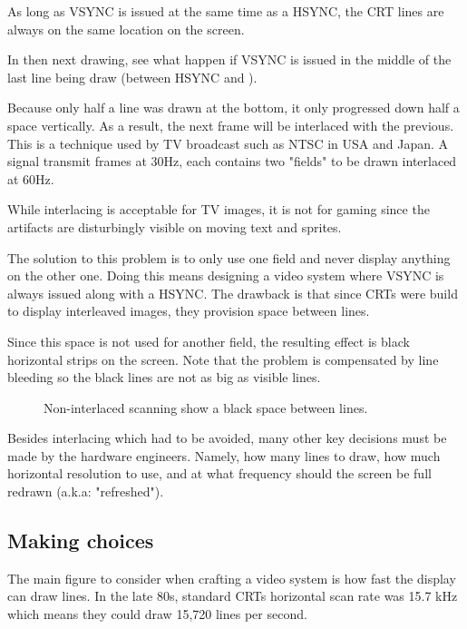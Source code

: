 
As long as VSYNC is issued at the same time as a HSYNC, the CRT lines are always on the same location on the screen.

In then next drawing, see what happen if VSYNC  is issued in the middle of the last line being draw (between HSYNC  and ).


Because only half a line was drawn at the bottom, it only progressed down half a space vertically. As a result, the next frame will be interlaced with the previous. This is a technique used by TV broadcast such as NTSC in USA and Japan. A signal transmit frames at 30Hz, each contains two "fields" to be drawn interlaced at 60Hz.

While interlacing is acceptable for TV images, it is not for gaming since the artifacts are disturbingly visible on moving text and sprites. 

The solution to this problem is to only use one field and never display anything on the other one. Doing this means designing a video system where VSYNC is always issued along with a HSYNC. The drawback is that since CRTs were build to display interleaved images, they provision space between lines. 

Since this space is not used for another field, the resulting effect is black horizontal strips on the screen. Note that the problem is compensated by line bleeding so the black lines are not as big as visible lines.

\begin{figure}[H]
\caption*{Non-interlaced scanning show a black space between lines.}
\end{figure}



Besides interlacing which had to be avoided, many other key decisions must be made by the hardware engineers. Namely, how many lines to draw, how much horizontal resolution to use, and at what frequency should the screen be full redrawn (a.k.a: "refreshed").





\subsection{Making choices}
 The main figure to consider when crafting a video system is how fast the display can draw lines. In the late 80s, standard CRTs horizontal scan rate was 15.7 kHz which means they could draw 15,720 lines per second.





